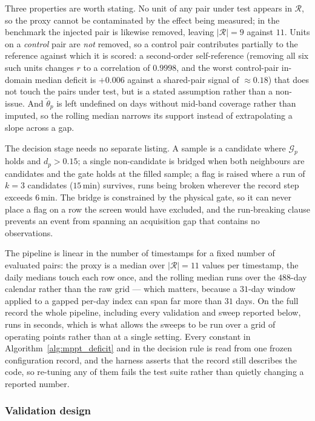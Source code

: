 Three properties are worth stating. No unit of any pair under test appears in $\mathcal{R}$, so the proxy cannot be contaminated by the effect being measured; in the benchmark the injected pair is likewise removed, leaving $|\mathcal{R}| = 9$ against $11$. Units on a \emph{control} pair are \emph{not} removed, so a control pair contributes partially to the reference against which it is scored: a second-order self-reference (removing all six such units changes $r$ to a correlation of $0.9998$, and the worst control-pair in-domain median deficit is $+0.006$ against a shared-pair signal of ${\approx}0.18$) that does not touch the pairs under test, but is a stated assumption rather than a non-issue. And $\tilde\theta_p$ is left undefined on days without mid-band coverage rather than imputed, so the rolling median narrows its support instead of extrapolating a slope across a gap.

The decision stage needs no separate listing. A sample is a candidate where $\mathcal{G}_p$ holds and $d_p > 0.15$; a single non-candidate is bridged when both neighbours are candidates and the gate holds at the filled sample; a flag is raised where a run of $k = 3$ candidates ($15$\,min) survives, runs being broken wherever the record step exceeds $6$\,min. The bridge is constrained by the physical gate, so it can never place a flag on a row the screen would have excluded, and the run-breaking clause prevents an event from spanning an acquisition gap that contains no observations.

The pipeline is linear in the number of timestamps for a fixed number of evaluated pairs: the proxy is a median over $|\mathcal{R}| = 11$ values per timestamp, the daily medians touch each row once, and the rolling median runs over the $488$-day calendar rather than the raw grid --- which matters, because a $31$-day window applied to a gapped per-day index can span far more than $31$ days. On the full record the whole pipeline, including every validation and sweep reported below, runs in seconds, which is what allows the sweeps to be run over a grid of operating points rather than at a single setting. Every constant in Algorithm~\ref{alg:mppt_deficit} and in the decision rule is read from one frozen configuration record, and the harness asserts that the record still describes the code, so re-tuning any of them fails the test suite rather than quietly changing a reported number.

\subsubsection{Validation design}
\label{sss:mppt_validation}

